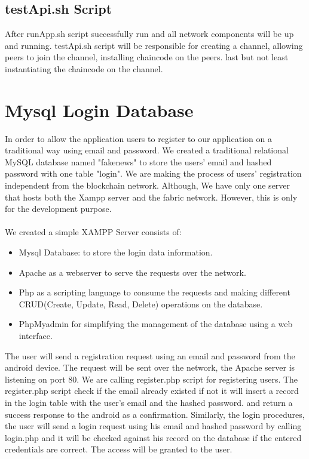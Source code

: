 \subsection{testApi.sh Script }

After runApp.sh script successfully run and all network components will be up and running. testApi.sh script will be responsible for creating a channel, allowing peers to join the channel, installing chaincode on the peers. last but not least instantiating the chaincode on the channel.
\cleardoublepage

\section{Mysql Login Database} 
In order to allow the application users to register to our application on a traditional way using email and password. We created a traditional relational MySQL database named "fakenews" to store the users' email and hashed password with one table "login". 
We are making the process of users' registration independent from the blockchain network.
Although, We have only one server that hosts both the Xampp server and the fabric network. However, this is only for the development purpose. \\
\ \\ 
We created a simple XAMPP Server consists of: 
\begin{itemize}
   \item Mysql Database: to store the login data information. 
   \item Apache as a webserver to serve the requests over the network. 
   \item Php as a scripting language to consume the requests and making different CRUD(Create, Update, Read, Delete) operations on the database.
   \item PhpMyadmin for simplifying the management of the database using a web interface. 
\end{itemize}  
\bigskip
The user will send a registration request using an email and password from the android device.  The request will be sent over the network, the Apache server is listening on port 80. We are calling register.php script for registering users. The register.php script check if the email already existed if not it will insert a record in the login table with the user's email and the hashed password. and return a success response to the android as a confirmation. 
Similarly,  the login procedures, the user will send a login request using his email and hashed password by calling login.php and it will be checked against his record on the database if the entered credentials are correct. The access will be granted to the user. \\ 
